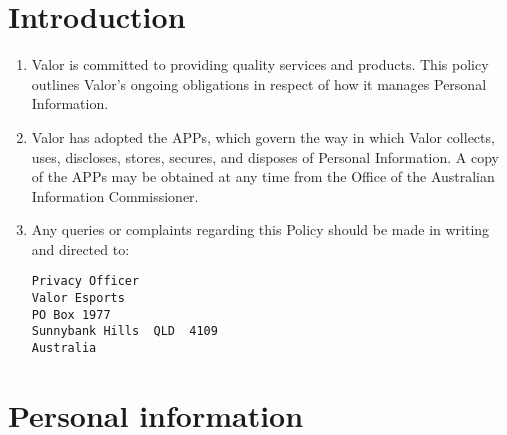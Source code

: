 \documentclass[10pt]{article}
\begin{document}
\section{Introduction}
\begin{enumerate}[(1)]
\item
Valor is committed to providing quality services and products. This policy outlines Valor's ongoing obligations in respect of how it manages Personal Information.

\item
Valor has adopted the APPs, which govern the way in which Valor collects, uses, discloses, stores, secures, and disposes of Personal Information. A copy of the APPs may be obtained at any time from the Office of the Australian Information Commissioner.

\item
Any queries or complaints regarding this Policy should be made in writing and directed to:
\begin{verbatim}
Privacy Officer
Valor Esports
PO Box 1977
Sunnybank Hills  QLD  4109
Australia
\end{verbatim}
\end{enumerate}


\section{Personal information}
\end{document}
